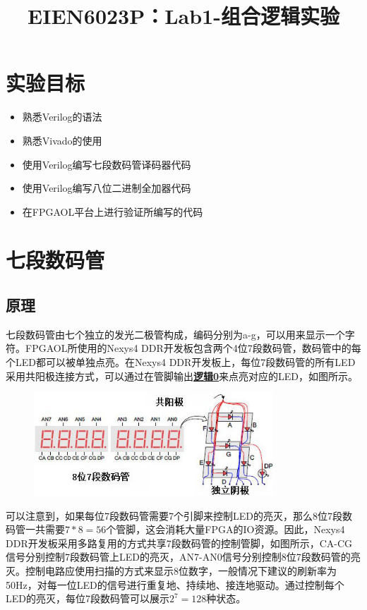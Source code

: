 \documentclass{ctexart}
\title{EIEN6023P：Lab1-组合逻辑实验}
\author{}
\date{}
\begin{document}
\maketitle

\section{实验目标}
\begin{itemize}
    \item 熟悉Verilog的语法
    \item 熟悉Vivado的使用
    \item 使用Verilog编写七段数码管译码器代码
    \item 使用Verilog编写八位二进制全加器代码
    \item 在FPGAOL平台上进行验证所编写的代码
\end{itemize}


\section{七段数码管}

\subsection{原理}

七段数码管由七个独立的发光二极管构成，编码分别为a-g，可以用来显示一个字符。FPGAOL所使用的Nexys4 DDR开发板包含两个4位7段数码管，数码管中的每个LED都可以被单独点亮。在Nexys4 DDR开发板上，每位7段数码管的所有LED采用共阳极连接方式，可以通过在管脚输出\underline{\textbf{逻辑0}}来点亮对应的LED，如图所示。

\begin{figure}[H]
    \centering
    \includegraphics[width=0.8\textwidth]{lab1/1.png}
\end{figure}

可以注意到，如果每位7段数码管需要7个引脚来控制LED的亮灭，那么8位7段数码管一共需要$7*8=56$个管脚，这会消耗大量FPGA的IO资源。因此，Nexys4 DDR开发板采用多路复用的方式共享7段数码管的控制管脚，如图所示，CA-CG信号分别控制7段数码管上LED的亮灭，AN7-AN0信号分别控制8位7段数码管的亮灭。控制电路应使用扫描的方式来显示8位数字，一般情况下建议的刷新率为50Hz，对每一位LED的信号进行重复地、持续地、接连地驱动。通过控制每个LED的亮灭，每位7段数码管可以展示$2^7=128$种状态。
\end{document}
